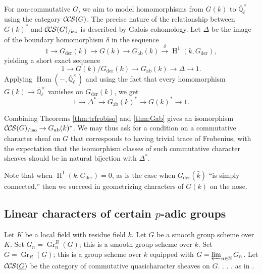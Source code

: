 \documentclass[10pt]{amsart}
\theoremstyle{plain}
\newtheorem{corollary}[theorem]{Corollary}
\theoremstyle{definition}
\newcommand{\NN}{{\mathbb{N}}}
\newcommand{\EE}{\mathbb{\bar Q}_\ell}
\newcommand{\bFq}{\bar{k}}
\newcommand{\Fq}{k}
\newcommand{\EEx}{\EE^\times}
\DeclareMathOperator{\Hom}{Hom}
\DeclareMathOperator{\Gr}{Gr}
\DeclareMathOperator{\Hh}{H}
\newcommand{\der}{_{\operatorname{der}}}
\newcommand{\ab}{_{\operatorname{ab}}}
\newcommand{\iso}{{\ \cong\ }}
\newcommand{\CCS}{{\mathcal{C\hskip-.8pt C\hskip-0.8pt S}}}
\newcommand{\CCSiso}[1]{\CCS(#1)_{/\text{iso}}}
\begin{document}
For non-commutative $G$, we aim to model homomorphisms from $G(k)$ to $\EEx$ using the category $\CCS(G)$.
The precise nature of the relationship between $G(k)^*$ and $\CCSiso{G}$ is described by Galois cohomology.
Let $\Delta$ be the image of the boundary homomorphism $\delta$ in the sequence
\[
1 \to G\der(k) \to G(k) \to G\ab(k) \xrightarrow{\delta} \Hh^1(k, G\der),
\]
yielding a short exact sequence
\[
1 \to G(k) / G\der(k) \to G\ab(k) \to \Delta \to 1.
\]
Applying $\Hom(-, \EEx)$ and using the fact that every homomorphism $G(k) \to \EEx$ vanishes on $G\der(k)$, we get
\[
1 \to \Delta^* \to G\ab(k)^* \to G(k)^* \to 1.
\]

Combining Theorems \ref{thm:trfrobiso} and \ref{thm:Gab} gives an isomorphism $\CCSiso{G} \to G\ab(k)^*$. 
We may thus ask for a condition on a commutative character sheaf on $G$ that corresponds to having trivial
trace of Frobenius, with the expectation that the isomorphism classes of such commutative character sheaves
should be in natural bijection with $\Delta^*$.

Note that when $\Hh^1(k,G\der) = 0$, as is the case when $G\der(\bFq)$ ``is simply connected,'' then
we succeed in geometrizing characters of $G(k)$ on the nose.

% 


\subsection{Linear characters of certain $p$-adic groups}

Let $K$ be a local field with residue field $\Fq$.
Let $\underline{G}$ be a smooth group scheme over $K$.
Set $G_n = \Gr^R_n(\underline{G})$; this is a smooth group scheme over $\Fq$.
Set $G = \Gr_R(\underline{G})$; this is a group scheme over $\Fq$ equipped with $G = \varprojlim_{n\in \NN} G_n$.
Let $\CCS(\underline{G})$ be the category of commutative quasicharacter sheaves on $G$. . . .  as in \cite{cunningham-roe:13a}.
\end{document}
